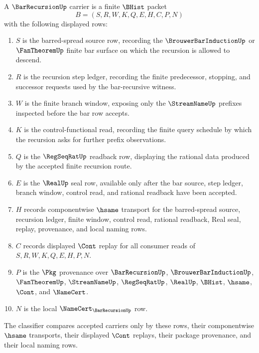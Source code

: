 \begin{definition}
\label{def:bar-recursion-carrier}
A $\BarRecursionUp$ carrier is a finite $\BHist$ packet
$$
B=(S,R,W,K,Q,E,H,C,P,N)
$$
with the following displayed rows:
\begin{enumerate}
\item $S$ is the barred-spread source row, recording the $\BrouwerBarInductionUp$ or $\FanTheoremUp$ finite bar surface on which the recursion is allowed to descend.
\item $R$ is the recursion step ledger, recording the finite predecessor, stopping, and successor requests used by the bar-recursive witness.
\item $W$ is the finite branch window, exposing only the $\StreamNameUp$ prefixes inspected before the bar row accepts.
\item $K$ is the control-functional read, recording the finite query schedule by which the recursion asks for further prefix observations.
\item $Q$ is the $\RegSeqRatUp$ readback row, displaying the rational data produced by the accepted finite recursion route.
\item $E$ is the $\RealUp$ seal row, available only after the bar source, step ledger, branch window, control read, and rational readback have been accepted.
\item $H$ records componentwise $\hsame$ transport for the barred-spread source, recursion ledger, finite window, control read, rational readback, Real seal, replay, provenance, and local naming rows.
\item $C$ records displayed $\Cont$ replay for all consumer reads of $S,R,W,K,Q,E,H,P,N$.
\item $P$ is the $\Pkg$ provenance over $\BarRecursionUp$, $\BrouwerBarInductionUp$, $\FanTheoremUp$, $\StreamNameUp$, $\RegSeqRatUp$, $\RealUp$, $\BHist$, $\hsame$, $\Cont$, and $\NameCert$.
\item $N$ is the local $\NameCert_{\BarRecursionUp}$ row.
\end{enumerate}
The classifier compares accepted carriers only by these rows, their componentwise $\hsame$ transports, their displayed $\Cont$ replays, their package provenance, and their local naming rows.
\end{definition}

